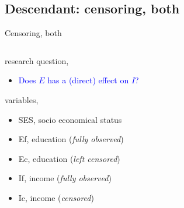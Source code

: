 \subsection{Descendant: censoring, both}
%
%
\begin{frame}[t, negative]
	\subsectionpage
\end{frame}
%
%	
\begin{frame}
	{Censoring, both}
	\begin{columns}
		\begin{column}{0.5\textwidth}
			research question, 
			\begin{itemize}
				\item \textcolor{blue}{Does $E$ has a (direct) effect on $I$?}
			\end{itemize}
			
			variables,
			\begin{itemize}
				\item SES, socio economical status
				\item Ef, education (\textit{fully observed})
				\item Ec, education (\textit{left censored})
				\item If, income (\textit{fully observed})
				\item Ic, income (\textit{censored})
			\end{itemize}
			

\end{column}
\end{columns}
\end{frame}
